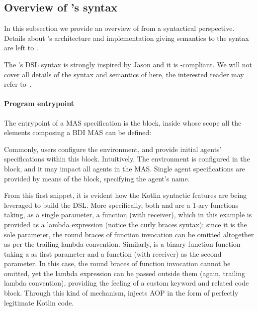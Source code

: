 \subsection{Overview of \jakta{}'s syntax}
\label{subsec:language-description}

In this subsection we provide an overview of \jakta{} from a syntactical perspective.
%
Details about \jakta{}'s architecture and implementation giving semantics to the syntax are left to .

The \jakta{}'s \ac{DSL} syntax is strongly inspired by Jason and it is \agentspeak{}-compliant.
%
We will not cover all details of the syntax and semantics of \agentspeak{} here,
the interested reader may refer to~\cite{BordiniHW2007}.


\paragraph{Program entrypoint}

The entrypoint of a \ac{MAS} specification is the  block,
inside whose scope all the elements composing a \ac{BDI} \ac{MAS} can be defined:
%

%
Commonly, users configure the environment, and provide initial agents' specifications within this block.
%
Intuitively, The environment is configured in the  block,
and it may impact all agents
in the \ac{MAS}.
%
Single agent specifications are provided by means of the  block,
specifying the agent's name.

From this first snippet,
it is evident how the Kotlin syntactic features are being leveraged to build the \ac{DSL}.
%
More specifically, both  and  are a 1-ary functions taking,
as a single parameter,
a function (with receiver), which in this example is provided as a lambda expression
(notice the curly braces syntax);
since it is the sole parameter, the round braces of function invocation can be omitted altogether
as per the trailing lambda convention.
%
Similarly,  is a binary function function taking a  as first parameter
and a function (with receiver) as the second parameter.
%
In this case, the round braces of function invocation cannot be omitted,
yet the lambda expression can be passed outside them
(again, trailing lambda convention),
providing the feeling of a custom keyword and related code block.
%
Through this kind of mechanism,
\jakta{} injects \ac{AOP} in the form of perfectly legitimate Kotlin code.


